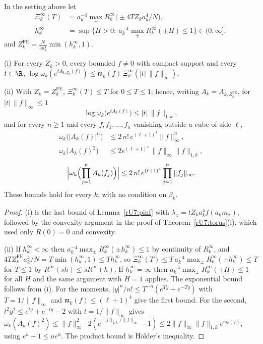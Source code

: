 \begin{theorem}
\label{rU7:zfour}
In the setting above let
\begin{align*}
\Xi_k^\infty(T)&=a_k^{-4}\max_\pm R_k^\infty\bigl(\pm4TZ_ka_k^4/N\bigr),\\
h_k^\infty&=\sup\bigl\{H>0:\ a_k^{-4}\max_\pm R_k^\infty(\pm H)\le1\bigr\}\in
(0,\infty],
\end{align*}
and $Z_k^{\mathrm{FE}}=\frac N{4a_k^4}\min(h_k^\infty,1)$.

\textup{(i)} For every $Z_k>0$, every bounded $f\ne0$ with compact support and
every $t\in\R$,
$\log\omega_k(e^{tA_{k,Z_k}(f)})\le\mathfrak m_k(f)\,\Xi_k^\infty(|t|\,\|f\|
_\infty)$.

\textup{(ii)} With $Z_k=Z_k^{\mathrm{FE}}$, $\Xi_k^\infty(T)\le T$ for $0\le T
\le1$; hence, writing $A_k=A_{k,Z_k^{\mathrm{FE}}}$, for $|t|\,\|f\|_\infty
\le1$
\[
\log\omega_k\bigl(e^{tA_k(f)}\bigr)\le|t|\,\|f\|_{1,k},
\]
and for every $n\ge1$ and every $f,f_1,\dots,f_n$ vanishing outside a cube of
side $\ell$,
\begin{align*}
\omega_k\bigl(|A_k(f)|^n\bigr)&\le2\,n!\,e^{(\ell+1)^4}\|f\|_\infty^n,\\
\omega_k\bigl(A_k(f)^2\bigr)&\le2e^{(\ell+1)^4}\,\|f\|_\infty\|f\|_{1,k},
\end{align*}
\[
\Bigl|\omega_k\Bigl(\prod_{j=1}^nA_k(f_j)\Bigr)\Bigr|\le2\,n!\,e^{(\ell+1)^4}
\prod_{j=1}^n\|f_j\|_\infty .
\]
These bounds hold for every $k$, with no condition on $\beta_k$.
\end{theorem}

\begin{proof}
(i) is the last bound of Lemma~\ref{rU7:pinf} with $\lambda_x=tZ_ka_k^4f(a_k
m_x)$, followed by the convexity argument in the proof of
Theorem~\ref{rU7:torus}(i), which used only $R(0)=0$ and convexity.

(ii) If $h_k^\infty<\infty$ then $a_k^{-4}\max_\pm R_k^\infty(\pm h_k^\infty)
\le1$ by continuity of $R_k^\infty$, and $4TZ_k^{\mathrm{FE}}a_k^4/N=T\min(h_k
^\infty,1)\le Th_k^\infty$, so $\Xi_k^\infty(T)\le T\,a_k^{-4}\max_\pm
R_k^\infty(\pm h_k^\infty)\le T$ for $T\le1$ by $R^\infty(sh)\le sR^\infty
(h)$. If $h_k^\infty=\infty$ then $a_k^{-4}\max_\pm R_k^\infty(\pm H)\le1$
for all $H$ and the same argument with $H=1$ applies. The exponential bound
follows from (i). For the moments, $|y|^n/n!\le T^{-n}(e^{Ty}+e^{-Ty})$ with
$T=1/\|f\|_\infty$ and $\mathfrak m_k(f)\le(\ell+1)^4$ give the first bound.
For the second, $t^2y^2\le e^{ty}+e^{-ty}-2$ with $t=1/\|f\|_\infty$ gives
$\omega_k(A_k(f)^2)\le\|f\|_\infty^2\cdot2(e^{\|f\|_{1,k}/\|f\|_\infty}-1)
\le2\|f\|_\infty\|f\|_{1,k}e^{\mathfrak m_k(f)}$, using $e^u-1\le ue^u$. The
product bound is H\"older's inequality.
\end{proof}


